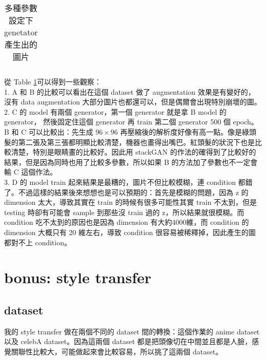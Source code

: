 \documentclass[10pt, a4paper]{article}
\begin{document}
\begin{CJK}{UTF8}{bkai}
\begin{table}[!htb]
\begin{tabular}{|c|c|c|c|}
\end{tabular} 
\caption{多種參數設定下 genetator 產生出的圖片}
\label{table:1}
\end{table}
\noindent
從 Table \ref{table:1}可以得到一些觀察：\\
1. A 和 B 的比較可以看出在這個 dataset 做了 augmentation 效果是有變好的，沒有 data augmentation 大部分圖片也都還可以，但是偶爾會出現特別崩壞的圖。\\
2. C 的 model 有兩個 generator，第一個 generator 就是拿 B model 的 generator， 然後固定住這個 generator 再 train 第二個 generator 500 個 epoch。B 和 C 可以比較出：先生成 $96 \times 96$ 再壓縮後的解析度好像有高一點。像是綠頭髮的第二張及第三張都明顯比較清楚，機器也畫得出嘴巴。紅頭髮的狀況下也是比較清楚，特別是眼睛畫的比較好。因此用 stackGAN 的作法的確得到了比較好的結果，但是因為同時也用了比較多參數，所以如果 B 的方法加了參數也不一定會輸 C 這個作法。\\
3. D 的 model train 起來結果是最糟的，圖片不但比較模糊，連 condition 都錯了。不過這樣的結果後來想想也是可以預期的：首先是模糊的問題，因為 z 的 dimension 太大，導致其實在 train 的時候有很多可能性其實 train 不太到，但是 testing 時卻有可能會 sample 到那些沒 train 過的 z，所以結果就很模糊。而 condition 吃不太到的原因也是因為 dimension 有大約4000維，而 condition 的 dimension 大概只有 20 維左右，導致 condition 很容易被稀釋掉，因此產生的圖都對不上 condition。

\section{bonus: style transfer}
\subsection{dataset}
我的 style transfer 做在兩個不同的 dataset 間的轉換：這個作業的 anime dataset 以及 celebA dataset。因為這兩個 dataset 都是把頭像切在中間並且都是人臉，感覺關聯性比較大，可能做起來會比較容易，所以挑了這兩個 dataset。\\

\end{CJK}
\end{document}
